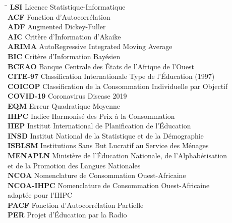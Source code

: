 \documentclass[
12pt,          %
a4paper,       %
oneside,       %
openright      %
]{report}
\begin{document}
	\begin{tabbing}
		\hspace{4cm} \= \kill   %
		\textbf{LSI}  \> Licence Statistique-Informatique \\[3pt]
		 \textbf{ACF}      \> Fonction d'Autocorrélation \\[3pt]
		\textbf{ADF}      \> Augmented Dickey-Fuller \\[3pt]
		\textbf{AIC}      \> Critère d'Information d'Akaike \\[3pt]
		\textbf{ARIMA}    \> AutoRegressive Integrated Moving Average \\[3pt]
		\textbf{BIC}      \> Critère d'Information Bayésien \\[3pt]
		\textbf{BCEAO}    \> Banque Centrale des États de l'Afrique de l'Ouest \\[3pt]
		\textbf{CITE-97}  \> Classification Internationale Type de l'Éducation (1997) \\[3pt]
		\textbf{COICOP}   \> Classification de la Consommation Individuelle par Objectif \\[3pt]
		\textbf{COVID-19} \> Coronavirus Disease 2019 \\[3pt]
		\textbf{EQM}      \> Erreur Quadratique Moyenne \\[3pt]
		\textbf{IHPC}     \> Indice Harmonisé des Prix à la Consommation \\[3pt]
		\textbf{IIEP}     \> Institut International de Planification de l'Éducation \\[3pt]
		\textbf{INSD}     \> Institut National de la Statistique et de la Démographie \\[3pt]
		\textbf{ISBLSM}   \> Institutions Sans But Lucratif au Service des Ménages \\[3pt]
		\textbf{MENAPLN}  \> Ministère de l'Éducation Nationale, de l'Alphabétisation \\[3pt]
		\> et de la Promotion des Langues Nationales \\[3pt]
		\textbf{NCOA}     \> Nomenclature de Consommation Ouest-Africaine \\[3pt]
		\textbf{NCOA-IHPC}\> Nomenclature de Consommation Ouest-Africaine \\[3pt]
		\> adaptée pour l'IHPC \\[3pt]
		\textbf{PACF}     \> Fonction d'Autocorrélation Partielle \\[3pt]
		\textbf{PER}      \> Projet d'Éducation par la Radio \\[3pt]

\end{tabbing}
\end{document}

